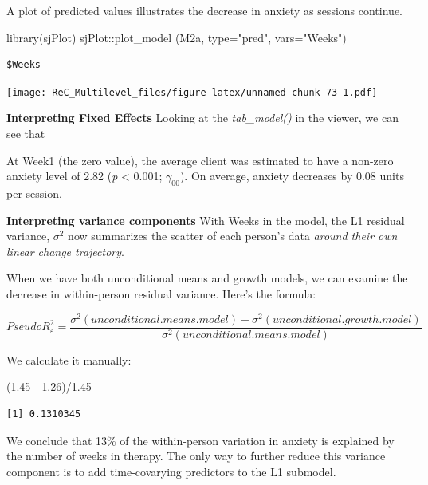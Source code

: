 \documentclass[
  11pt,
]{book}
\newenvironment{Shaded}{\begin{snugshade}}{\end{snugshade}}
\newcommand{\AttributeTok}[1]{\textcolor[rgb]{0.77,0.63,0.00}{#1}}
\newcommand{\FloatTok}[1]{\textcolor[rgb]{0.00,0.00,0.81}{#1}}
\newcommand{\FunctionTok}[1]{\textcolor[rgb]{0.00,0.00,0.00}{#1}}
\newcommand{\NormalTok}[1]{#1}
\newcommand{\SpecialCharTok}[1]{\textcolor[rgb]{0.00,0.00,0.00}{#1}}
\newcommand{\StringTok}[1]{\textcolor[rgb]{0.31,0.60,0.02}{#1}}
\begin{document}
A plot of predicted values illustrates the decrease in anxiety as sessions continue.

\begin{Shaded}
\begin{Highlighting}[]
\FunctionTok{library}\NormalTok{(sjPlot)}
\NormalTok{sjPlot}\SpecialCharTok{::}\FunctionTok{plot\_model}\NormalTok{ (M2a, }\AttributeTok{type=}\StringTok{"pred"}\NormalTok{, }\AttributeTok{vars=}\StringTok{"Weeks"}\NormalTok{)}
\end{Highlighting}
\end{Shaded}

\begin{verbatim}
$Weeks
\end{verbatim}

\texttt{[image: ReC\_Multilevel\_files/figure-latex/unnamed-chunk-73-1.pdf]}

\textbf{Interpreting Fixed Effects}
Looking at the \emph{tab\_model()} in the viewer, we can see that

At Week1 (the zero value), the average client was estimated to have a non-zero anxiety level of 2.82 (\emph{p} \textless{} 0.001; \(\gamma _{00}\)). On average, anxiety decreases by 0.08 units per session.

\textbf{Interpreting variance components}
With Weeks in the model, the L1 residual variance, \(\sigma^{2}\) now summarizes the scatter of each person's data \emph{around their own linear change trajectory}.

When we have both unconditional means and growth models, we can examine the decrease in within-person residual variance. Here's the formula:

\[Pseudo R_{\varepsilon }^{2} = \frac{\sigma^{2}(unconditional. means. model) - \sigma^{2}(unconditional. growth. model)}{\sigma ^{2}(unconditional. means. model)}\]

We calculate it manually:

\begin{Shaded}
\begin{Highlighting}[]
\NormalTok{(}\FloatTok{1.45} \SpecialCharTok{{-}} \FloatTok{1.26}\NormalTok{)}\SpecialCharTok{/}\FloatTok{1.45}
\end{Highlighting}
\end{Shaded}

\begin{verbatim}
[1] 0.1310345
\end{verbatim}

We conclude that 13\% of the within-person variation in anxiety is explained by the number of weeks in therapy. The only way to further reduce this variance component is to add time-covarying predictors to the L1 submodel.
\end{document}
